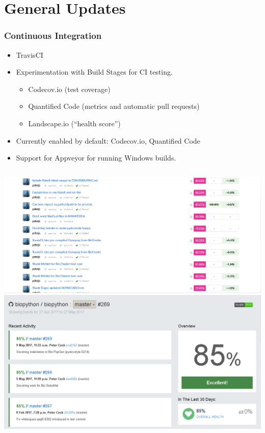 \documentclass[trans]{beamer}
\begin{document}
\section{General Updates}
\frame
{
  \frametitle{Continuous Integration}

  \begin{itemize}
  \item TravisCI
  \item Experimentation with Build Stages for CI testing.
  \begin{itemize}
  \item Codecov.io (test coverage)
  \item Quantified Code (metrics and automatic pull requests)
  \item Landscape.io (``health score'')
  \end{itemize}
  \item Currently enabled by default: Codecov.io, Quantified Code
  \item Support for Appveyor for running Windows builds.
  \end{itemize}

  \begin{columns}
  \includegraphics[width=1\textwidth]{figures/bp-codecov.png}
  \includegraphics[width=1\textwidth]{figures/bp-landscape.png}
  \end{columns}
}
\end{document}
